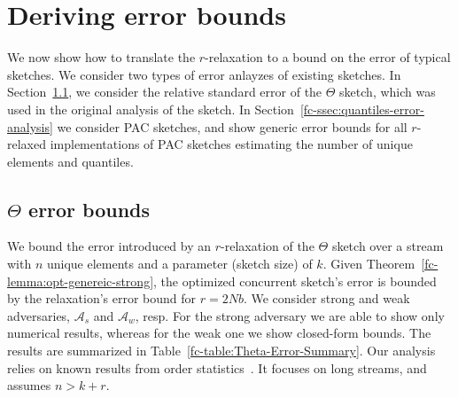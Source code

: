 \section{Deriving error bounds}
\label{fc-sec:error-bounds}

We now show how to translate the $r$-relaxation to a bound on the error of typical sketches.
We consider two types of error anlayzes of existing sketches. In Section~\ref{fc-ssec:theta-analysis}, we consider the 
relative standard error of the $\Theta$ sketch, which was used in the original analysis of the sketch.  
In Section~\ref{fc-ssec:quantiles-error-analysis} we consider PAC sketches, and show generic error bounds for all $r$-relaxed 
implementations of PAC sketches estimating the number of unique elements and quantiles.  




\subsection{\texorpdfstring{$\Theta$}{Theta} error bounds}
\label{fc-ssec:theta-analysis}

We bound the error introduced by an $r$-relaxation of the $\Theta$ sketch over a stream with $n$ unique elements and a parameter (sketch size) of $k$. Given
Theorem~\ref{fc-lemma:opt-genereic-strong}, the optimized concurrent sketch's error is bounded
by the relaxation's error bound for $r=2Nb$. We consider strong and weak adversaries,
${\mathcal{A}}_s$ and ${\mathcal{A}}_w$, resp. For the strong adversary we are able to show only numerical
results, whereas for the weak one we show closed-form bounds. The results are summarized in Table~\ref{fc-table:Theta-Error-Summary}.
Our analysis relies on known results from order statistics~\cite{david2004order}.
It focuses on long streams, and assumes $n>k+r$.

